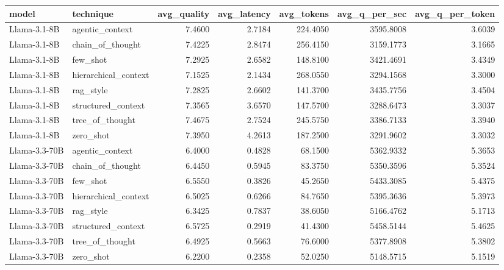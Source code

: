 \begin{tabular}{llrrrrr}
\toprule
model & technique & avg_quality & avg_latency & avg_tokens & avg_q_per_sec & avg_q_per_token \\
\midrule
Llama-3.1-8B & agentic_context & 7.4600 & 2.7184 & 224.4050 & 3595.8008 & 3.6039 \\
Llama-3.1-8B & chain_of_thought & 7.4225 & 2.8474 & 256.4150 & 3159.1773 & 3.1665 \\
Llama-3.1-8B & few_shot & 7.2925 & 2.6582 & 148.8100 & 3421.4691 & 3.4349 \\
Llama-3.1-8B & hierarchical_context & 7.1525 & 2.1434 & 268.0550 & 3294.1568 & 3.3000 \\
Llama-3.1-8B & rag_style & 7.2825 & 2.6602 & 141.3700 & 3435.7756 & 3.4504 \\
Llama-3.1-8B & structured_context & 7.3565 & 3.6570 & 147.5700 & 3288.6473 & 3.3037 \\
Llama-3.1-8B & tree_of_thought & 7.4675 & 2.7524 & 245.5750 & 3386.7133 & 3.3940 \\
Llama-3.1-8B & zero_shot & 7.3950 & 4.2613 & 187.2500 & 3291.9602 & 3.3032 \\
Llama-3.3-70B & agentic_context & 6.4000 & 0.4828 & 68.1500 & 5362.9332 & 5.3653 \\
Llama-3.3-70B & chain_of_thought & 6.4450 & 0.5945 & 83.3750 & 5350.3596 & 5.3524 \\
Llama-3.3-70B & few_shot & 6.5550 & 0.3826 & 45.2650 & 5433.3085 & 5.4375 \\
Llama-3.3-70B & hierarchical_context & 6.5025 & 0.6266 & 84.7650 & 5395.3636 & 5.3973 \\
Llama-3.3-70B & rag_style & 6.3425 & 0.7837 & 38.6050 & 5166.4762 & 5.1713 \\
Llama-3.3-70B & structured_context & 6.5725 & 0.2919 & 41.4300 & 5458.5144 & 5.4625 \\
Llama-3.3-70B & tree_of_thought & 6.4925 & 0.5663 & 76.6000 & 5377.8908 & 5.3802 \\
Llama-3.3-70B & zero_shot & 6.2200 & 0.2358 & 52.0250 & 5148.5715 & 5.1519 \\
\bottomrule
\end{tabular}
